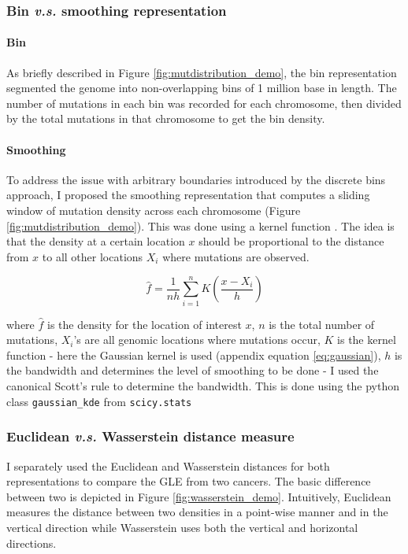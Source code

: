 
\subsubsection{Bin \textit{v.s.} smoothing representation}
\paragraph{Bin} As briefly described in Figure \ref{fig:mutdistribution_demo}, the bin representation segmented the genome into non-overlapping bins of 1 million base in length. The number of mutations in each bin was recorded for each chromosome, then divided by the total mutations in that chromosome to get the bin density. 
\paragraph{Smoothing} To address the issue with arbitrary boundaries introduced by the discrete bins approach, I proposed the smoothing representation that computes a sliding window of mutation density across each chromosome (Figure \ref{fig:mutdistribution_demo}). This was done using a kernel function \citep[equation \ref{eq:density};][]{Silverman1986DensityAnalysis}. The idea is that the density at a certain location $x$ should be proportional to the distance from $x$ to all other locations $X_i$ where mutations are observed. 

\begin{equation}
    \hat{f} = \frac{1}{nh} \underset{i=1}{\overset{n}{\sum}} K(\frac{x- X_i}{h})
    \label{eq:density}
\end{equation}

where $\hat{f}$ is the density for the location of interest $x$, $n$ is the total number of mutations, $X_i$'s are all genomic locations where mutations occur, $K$ is the kernel function - here the Gaussian kernel is used (appendix equation \ref{eq:gaussian}), $h$ is the bandwidth and determines the level of smoothing to be done - I used the canonical Scott's rule \citep[appendix equation \ref{eq:bandwidth};][]{Scott1992MultivariateEstimation} to determine the bandwidth. This is done using the python class \texttt{gaussian\_kde} from \texttt{scicy.stats}

\subsubsection{Euclidean \textit{v.s.} Wasserstein distance measure}
I separately used the Euclidean and Wasserstein distances for both representations to compare the GLE from two cancers. The basic difference between two is depicted in Figure \ref{fig:wasserstein_demo}. Intuitively, Euclidean measures the distance between two densities in a point-wise manner and in the vertical direction while Wasserstein uses both the vertical and horizontal directions. 

